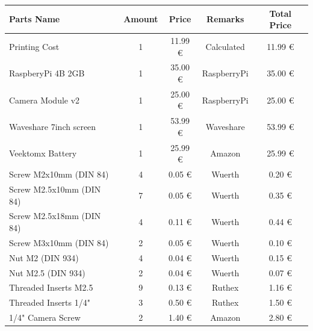 \begin{table}[!ht]
    \centering
    \begin{tabular}{|l|c|c|c|c|}
        \hline
        \textbf{Parts Name}          & \textbf{Amount} & \textbf{Price} & \textbf{Remarks} & \textbf{Total Price} \\ \hline
        Printing Cost                & 1               & 11.99 €        & Calculated       & 11.99 €              \\ \hline
        RaspberyPi 4B 2GB            & 1               & 35.00 €        & RaspberryPi      & 35.00 €              \\ \hline
        Camera Module v2             & 1               & 25.00 €        & RaspberryPi      & 25.00 €              \\ \hline
        Waveshare 7inch screen       & 1               & 53.99 €        & Waveshare        & 53.99 €              \\ \hline
        Veektomx Battery             & 1               & 25.99 €        & Amazon           & 25.99 €              \\ \hline
        Screw M2x10mm (DIN 84)       & 4               & 0.05 €         & Wuerth           & 0.20 €               \\ \hline
        Screw M2.5x10mm (DIN 84)     & 7               & 0.05 €         & Wuerth           & 0.35 €               \\ \hline
        Screw M2.5x18mm (DIN 84)     & 4               & 0.11 €         & Wuerth           & 0.44 €               \\ \hline
        Screw M3x10mm (DIN 84)       & 2               & 0.05 €         & Wuerth           & 0.10 €               \\ \hline
        Nut M2 (DIN 934)             & 4               & 0.04 €         & Wuerth           & 0.15 €               \\ \hline
        Nut M2.5 (DIN 934)           & 2               & 0.04 €         & Wuerth           & 0.07 €               \\ \hline
        Threaded Inserts M2.5        & 9               & 0.13 €         & Ruthex           & 1.16 €               \\ \hline
        Threaded Inserts 1/4"        & 3               & 0.50 €         & Ruthex           & 1.50 €               \\ \hline
        1/4" Camera Screw            & 2               & 1.40 €         & Amazon           & 2.80 €               \\ \hline

\end{tabular}
\end{table}
